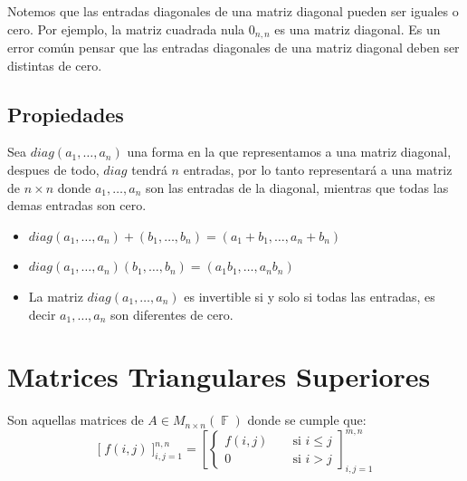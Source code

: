 \documentclass[12pt, fleqn]{report}                             %
\DeclareMathOperator \Space     {\quad}                         %
\DeclareMathOperator \MiniSpace {\;}                            %
\theoremstyle{break}                                            %
\DeclareMathOperator \GenericField {\mathbb{F}}                 %
\newcommand{\Brackets}[1]       {\left[ #1 \right]}             %
\newcommand{\BigBrackets}[1]    {\Big[ \; #1 \; \Big]}          %
\begin{document}
                Notemos que las entradas diagonales de una matriz diagonal pueden ser iguales o cero.
                Por ejemplo, la matriz cuadrada nula $0_{n, n}$ es una matriz diagonal.
                Es un error común pensar que las entradas diagonales de una matriz diagonal deben
                ser distintas de cero.


            \clearpage
            \subsection{Propiedades}

                Sea $diag(a_1, \dots, a_n)$ una forma en la que representamos a una matriz diagonal,
                despues de todo, $diag$ tendrá $n$ entradas, por lo tanto representará a una matriz
                de $n \times n$ donde $a_1, \dots, a_n$ son las entradas de la diagonal, mientras que
                todas las demas entradas son cero.

                \begin{itemize}
                    
                    \item
                        $diag(a_1, \dots, a_n) + (b_1, \dots, b_n) = (a_1+b_1, \dots, a_n+b_n)$

                    \item
                        $diag(a_1, \dots, a_n)(b_1, \dots, b_n) = (a_1b_1, \dots, a_nb_n)$

                    \item 
                        La matriz $diag(a_1, \dots, a_n)$ es invertible si y solo si todas las entradas, 
                        es decir $a_1, \dots, a_n$ son diferentes de cero. 

                \end{itemize}



        \clearpage
        \section{Matrices Triangulares Superiores}

            Son aquellas matrices de $A \in M_{n \times n}(\GenericField)$ donde se cumple que: 
            \begin{equation*}
                \BigBrackets{f(i,j)}_{i, j = 1}^{n, n}
                =
                \Brackets{
                    \begin{cases}
                        f(i,j)  \MiniSpace& \text{ si } i \leq j \\
                        0       \MiniSpace& \text{ si } i > j
                    \end{cases}
                }_{i, j = 1}^{m, n}  
            \end{equation*}
\end{document}

